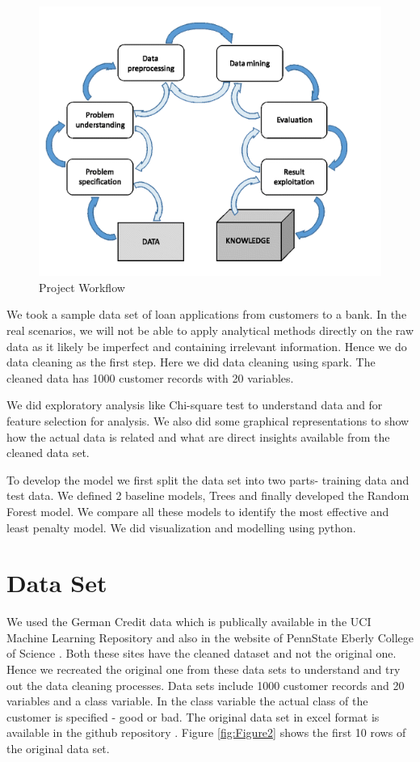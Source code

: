 \documentclass[sigconf]{acmart}
\begin{document}
\begin{figure}[htb]
  \centering
  \includegraphics[width=1.0\columnwidth]{project/images/Figure1.png}
  \caption{Project Workflow
  \cite{preprocessing}}
  \label{fig:Figure1} 
\end{figure}

We took a sample data set of loan applications from customers to a bank. In the real scenarios, we will not be able to apply analytical methods directly on the raw data as it likely be imperfect and containing irrelevant information. Hence we do data cleaning as the first step. Here we did data cleaning using spark. The cleaned data has 1000 customer records with 20 variables.

We did exploratory analysis like Chi-square test to understand data and for feature selection for analysis. We also did some graphical representations to show how the actual data is related and what are direct insights available from the cleaned data set.

To develop the model we first split the data set into two parts- training data and test data. We defined 2 baseline models, Trees and finally developed the Random Forest model. We compare all these models to identify the most effective and least penalty model. We did visualization and modelling using python.

\section{Data Set}

We used the German Credit data which is publically available in the UCI Machine Learning Repository \cite{uci} and also in the website of PennState Eberly College of Science \cite{psu-site}. Both these sites have the cleaned dataset and not the original one. Hence we recreated the original one from these data sets to understand and try out the data cleaning processes. Data sets include 1000 customer records and 20 variables and a class variable. In the class variable the actual class of the customer is specified - good or bad. The original data set in excel format is available in the github repository \cite{github}. Figure \ref{fig:Figure2} shows the first 10 rows of the original data set.
\end{document}
